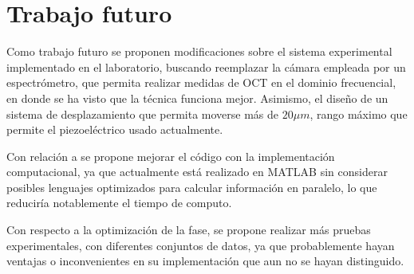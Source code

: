 \section{Trabajo futuro}

Como trabajo futuro se proponen modificaciones sobre el sistema experimental implementado en el laboratorio, buscando reemplazar la cámara empleada por un espectrómetro, que permita realizar medidas de OCT en el dominio frecuencial, en donde se ha visto que la técnica funciona mejor. Asimismo, el diseño de un sistema de desplazamiento que permita moverse más de $20\mu m$, rango máximo que permite el piezoeléctrico usado actualmente.

Con relación a \nlmeansOCT se propone mejorar el código con la implementación computacional, ya que actualmente está realizado en MATLAB sin considerar posibles lenguajes optimizados para calcular información en paralelo, lo que reduciría notablemente el tiempo de computo.

Con respecto a la optimización de la fase, se propone realizar más pruebas experimentales, con diferentes conjuntos de datos, ya que probablemente hayan ventajas o inconvenientes en su implementación que aun no se hayan distinguido.